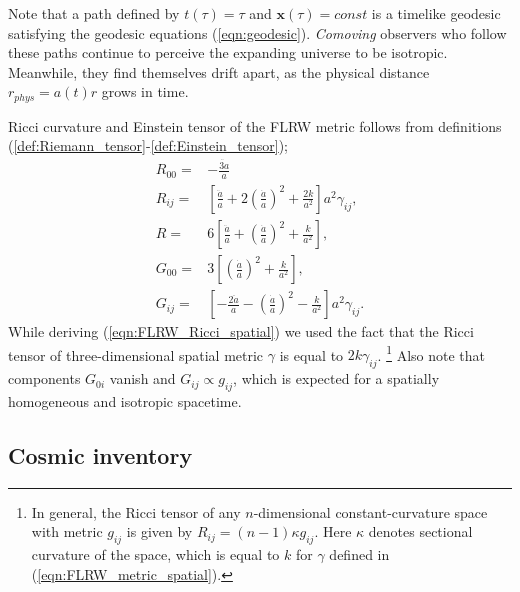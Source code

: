 Note that a path defined by $t(\tau)=\tau$ and $\mathbf{x}(\tau)=const$ is a timelike geodesic satisfying the geodesic equations (\ref{eqn:geodesic}). \textit{Comoving} observers who follow these paths continue to perceive the expanding universe to be isotropic. Meanwhile, they find themselves drift apart, as the physical distance $r_{phys} = a(t) r$ grows in time.

Ricci curvature and Einstein tensor of the FLRW metric follows from definitions (\ref{def:Riemann_tensor}-\ref{def:Einstein_tensor});
\begin{align}
	R_{00} =& - \frac{\ddot{3a}}{a} \\
	R_{ij} =& \left[ \frac{\ddot{a}}{a} + 2 \left( \frac{\dot{a}}{a} \right)^2 + \frac{2k}{a^2} \right] a^2 \gamma_{ij}, \label{eqn:FLRW_Ricci_spatial}\\
	R =& 6 \left[ \frac{\ddot{a}}{a} + \left( \frac{\dot{a}}{a} \right)^2 + \frac{k}{a^2} \right], \\
	G_{00} =& 3 \left[ \left( \frac{\dot{a}}{a} \right)^2 + \frac{k}{a^2} \right], \label{eqn:Einstein_tensor_FLRW_00} \\
	G_{ij} =& \left[ - \frac{2\ddot{a}}{a} - \left( \frac{\dot{a}}{a} \right)^2 - \frac{k}{a^2} \right] a^2 \gamma_{ij}. \label{eqn:Einstein_tensor_FLRW_ij}
\end{align}
While deriving (\ref{eqn:FLRW_Ricci_spatial}) we used the fact that the Ricci tensor of three-dimensional spatial metric $\gamma$ is equal to $2k\gamma_{ij}$. \footnote{In general, the Ricci tensor of any $n$-dimensional constant-curvature space with metric $g_{ij}$ is given by $R_{ij} = (n-1)\kappa g_{ij}$. Here $\kappa$ denotes sectional curvature of the space, which is equal to $k$ for $\gamma$ defined in (\ref{eqn:FLRW_metric_spatial}).} Also note that components $G_{0i}$ vanish and $G_{ij} \propto g_{ij}$, which is expected for a spatially homogeneous and isotropic spacetime.

\subsection{Cosmic inventory}

